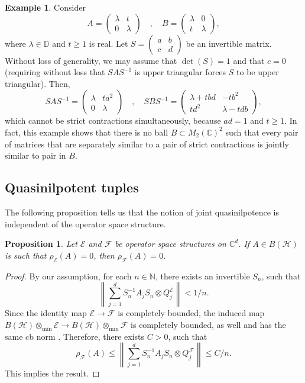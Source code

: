 \documentclass[12pt]{amsart}
\numberwithin{equation}{section}
\newtheorem{proposition}[theorem]{Proposition}
\theoremstyle{definition}
\newtheorem{example}[theorem]{Example}
\newcommand{\cE}{\mathcal{E}}
\newcommand{\cF}{\mathcal{F}}
\newcommand{\cH}{\mathcal{H}}
\newcommand{\bC}{\mathbb{C}}
\newcommand{\C}{\mathbb{C}}
\newcommand{\bD}{\mathbb{D}}
\newcommand{\bN}{\mathbb{N}}
\begin{document}
\begin{example}
Consider 
\[
A = \begin{pmatrix}
    \lambda & t \\ 0 & \lambda
\end{pmatrix} 
\quad, \quad 
B = \begin{pmatrix}
    \lambda & 0 \\ t & \lambda
\end{pmatrix}, 
\]
where $\lambda \in \bD$ and $t \geq 1$ is real. 
Let $S = \left(\begin{smallmatrix} a & b \\ c & d \end{smallmatrix} \right)$ be an invertible matrix. 
Without loss of generality, we may assume that $\det(S) = 1$ and that $c = 0$ (requiring without loss that $SAS^{-1}$ is upper triangular forces $S$ to be upper triangular). 
Then, 
\[
SAS^{-1} = \begin{pmatrix}
    \lambda & ta^2 \\ 0 & \lambda
\end{pmatrix} 
\quad, \quad 
S B S^{-1} = \begin{pmatrix}
    \lambda + tbd & -tb^2 \\ td^2 & \lambda - tdb
\end{pmatrix}, 
\]
which cannot be strict contractions simultaneously, because $ad=1$ and $t \geq 1$. 
In fact, this example shows that there is no ball $B \subset M_2(\bC)^2$ such that every pair of matrices that are separately similar to a pair of strict contractions is jointly similar to pair in $B$. 
\end{example}


\subsection{Quasinilpotent tuples}\label{subsec:quasinil}

The following proposition tells us that the notion of joint quasinilpotence is independent of the operator space structure.
\begin{proposition}\label{}
    Let $\cE$ and $\cF$ be operator space structures on $\C^d$. If $A \in B(\cH)$ is such that $\rho_{\cE}(A) = 0$, then $\rho_{\cF}(A) = 0$.
\end{proposition}
\begin{proof}
    By our assumption, for each $n \in \bN$, there exists an invertible $S_n$, such that 
    \[
    \left\| \sum_{j=1}^d S_n^{-1} A_j S_n \otimes Q_j^{\cE} \right\| < 1/n.
    \]
    Since the identity map $\cE \to \cF$ is completely bounded, the induced map $B(\cH) \otimes_{\min} \cE \to B(\cH) \otimes_{\min} \cF$ is completely bounded, as well and has the same cb norm \cite[Theorem 12.3]{PaulsenBook}. Therefore, there exists $C > 0$, such that
    \[
    \rho_{\cF}(A) \leq \left\| \sum_{j=1}^d S_n^{-1} A_j S_n \otimes Q_j^{\cF} \right\| \leq C/n.
    \]
    This implies the result.
\end{proof}
\end{document}
